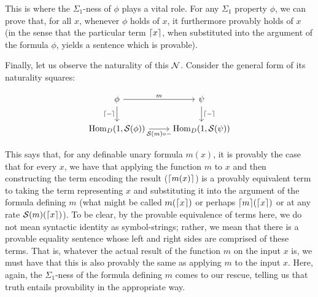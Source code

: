 \documentclass[./main.tex]{subfiles}
\begin{document}
This is where the $\Sigma_1$-ness of $\phi$ plays a vital role. For any $\Sigma_1$ property $\phi$, we can prove that, for all $x$, whenever $\phi$ holds of $x$, it furthermore provably holds of $x$ (in the sense that the particular term $\lceil x \rceil$, when substituted into the argument of the formula $\phi$, yields a sentence which is provable). 

Finally, let us observe the naturality of this $\mathcal{N}$. Consider the general form of its naturality squares:

\[\begin{tikzcd}
	\phi & \psi \\
	{\Hom_D(1, \introS(\phi))} & {\Hom_D(1, \introS(\psi))}
	\arrow["{\code{-}}"', from=1-1, to=2-1]
	\arrow["m", from=1-1, to=1-2]
	\arrow["{\code{-}}", from=1-2, to=2-2]
	\arrow["{\introS(m) \circ -}"', from=2-1, to=2-2]
\end{tikzcd}\]

This says that, for any definable unary formula $m(x)$, it is provably the case that for every $x$, we have that applying the function $m$ to $x$ and then constructing the term encoding the result ($\lceil m(x) \rceil$) is a provably equivalent term to taking the term representing $x$ and substituting it into the argument of the formula defining $m$ (what might be called $m(\lceil x \rceil)$ or perhaps $\lceil m \rceil(\lceil x \rceil)$ or at any rate $\mathcal{S}(m)(\lceil x \rceil)$). To be clear, by the provable equivalence of terms here, we do not mean syntactic identity as symbol-strings; rather, we mean that there is a provable equality sentence whose left and right sides are comprised of these terms. That is, whatever the actual result of the function $m$ on the input $x$ is, we must have that this is also provably the same as applying $m$ to the input $x$. Here, again, the $\Sigma_1$-ness of the formula defining $m$ comes to our rescue, telling us that truth entails provability in the appropriate way.
\end{document}
